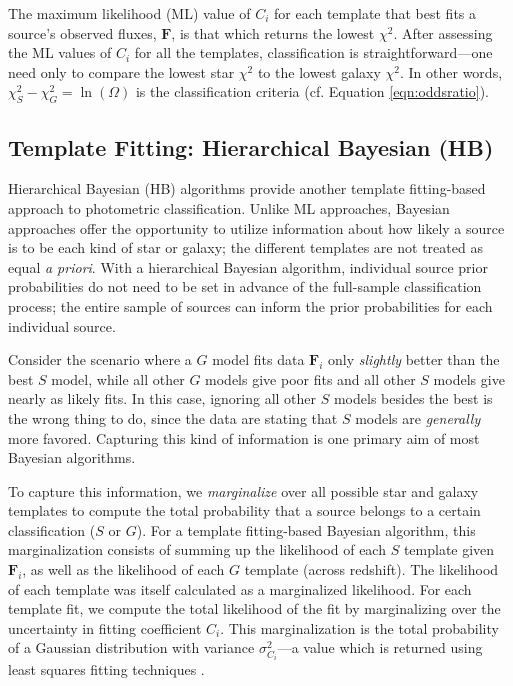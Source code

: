 \documentclass[12pt,preprint]{aastex}
\newcommand{\datavector}[1]{\boldsymbol{#1}}
\begin{document}

The maximum likelihood (ML) value of $C_i$ for each template that best
fits a source's observed fluxes, $\datavector{F}$, is that which
returns the lowest $\chi^2$. After assessing the ML values of $C_i$
for all the templates, classification is straightforward---one need
only to compare the lowest star $\chi^2$ to the lowest galaxy
$\chi^2$.  In other words, $\chi^2_S-\chi^2_G=\ln(\Omega)$ is the
classification criteria (cf. Equation \ref{eqn:oddsratio}).

\subsection{Template Fitting: Hierarchical Bayesian (HB)}
\label{ssec:HBmethod}

Hierarchical Bayesian (HB) algorithms provide another template
fitting-based approach to photometric classification.  Unlike ML
approaches, Bayesian approaches offer the opportunity to utilize
information about how likely a source is to be each kind of star or
galaxy; the different templates are not treated as equal \emph{a
priori}.  With a hierarchical Bayesian algorithm, individual source
prior probabilities do not need to be set in advance of the
full-sample classification process; the entire sample of sources can
inform the prior probabilities for each individual source.

Consider the scenario where a $G$ model fits data $\datavector{F}_i$
only \textit{slightly} better than the best $S$ model, while all other
$G$ models give poor fits and all other $S$ models give nearly as
likely fits.  In this case, ignoring all other $S$ models besides the
best is the wrong thing to do, since the data are stating that $S$
models are \textit{generally} more favored.  Capturing this kind of
information is one primary aim of most Bayesian algorithms.

To capture this information, we \textit{marginalize} over all possible
star and galaxy templates to compute the total probability that a
source belongs to a certain classification ($S$ or $G$).  For a
template fitting-based Bayesian algorithm, this marginalization
consists of summing up the likelihood of each $S$ template given
$\datavector{F}_i$, as well as the likelihood of each $G$ template
(across redshift).  The likelihood of each template was itself
calculated as a marginalized likelihood.  For each template fit, we
compute the total likelihood of the fit by marginalizing over the
uncertainty in fitting coefficient $C_i$.  This marginalization is the
total probability of a Gaussian distribution with variance
$\sigma_{C_i}^2$---a value which is returned using least squares
fitting techniques \citep[e.g.,][]{hogg10}.
\end{document}
